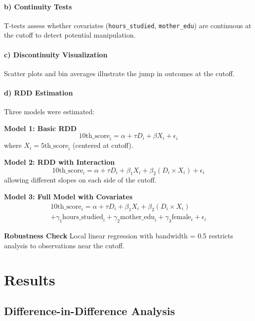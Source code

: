 \documentclass[a4paper,12pt,headsepline]{scrartcl} %
\begin{document}
\paragraph{b) Continuity Tests}
T-tests assess whether covariates (\texttt{hours\_studied}, \texttt{mother\_edu}) are continuous at the cutoff to detect potential manipulation.

\paragraph{c) Discontinuity Visualization}
Scatter plots and bin averages illustrate the jump in outcomes at the cutoff.

\paragraph{d) RDD Estimation}
Three models were estimated:

\textbf{Model 1: Basic RDD}
\begin{equation}
\text{10th\_score}_i = \alpha + \tau D_i + \beta X_i + \epsilon_i
\end{equation}
where $X_i = \text{5th\_score}_i$ (centered at cutoff).

\textbf{Model 2: RDD with Interaction}
\begin{equation}
\text{10th\_score}_i = \alpha + \tau D_i + \beta_1 X_i + \beta_2 (D_i \times X_i) + \epsilon_i
\end{equation}
allowing different slopes on each side of the cutoff.

\textbf{Model 3: Full Model with Covariates}
\begin{multline}
\text{10th\_score}_i = \alpha + \tau D_i + \beta_1 X_i + \beta_2 (D_i \times X_i) \\
+ \gamma_1 \text{hours\_studied}_i + \gamma_2 \text{mother\_edu}_i + \gamma_3 \text{female}_i + \epsilon_i
\end{multline}

\textbf{Robustness Check}
Local linear regression with bandwidth = 0.5 restricts analysis to observations near the cutoff.

\section{Results}

\subsection{Difference-in-Difference Analysis}
\end{document}
